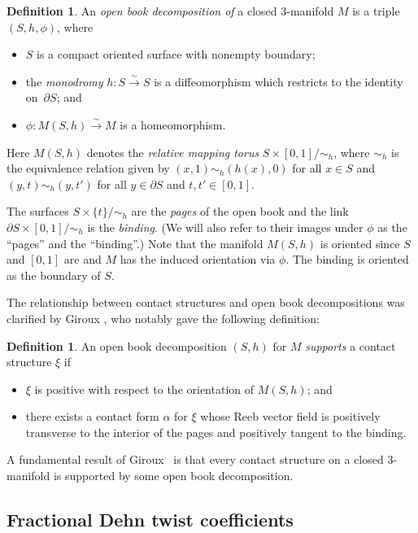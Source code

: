 \documentclass[JEP,XML,SOM,Unicode,NoFloatCountersInSection]{cedram}
\newcommand{\isom}{\stackrel\sim\longrightarrow}
\theoremstyle{plain}
\theoremstyle{definition}
\newtheorem{defn}[thm]{Definition}
\numberwithin{equation}{subsection}
\begin{document}

\begin{defn}
An {\em open book decomposition of} a closed $3$-manifold $M$ is a triple $(S,h,\phi)$, where
\begin{itemize}
\item $S$ is a compact oriented surface with nonempty boundary;
\item the {\em monodromy} $h:S\isom S$ is a diffeomorphism which restricts to the identity on~$\partial S$; and
\item $\phi : M(S,h) \isom M$ is a homeomorphism.
\end{itemize}
Here $M(S,h)$ denotes the {\em relative mapping torus} $S\times [0,1]/\sim_h$, where $\sim_h$ is the equivalence relation given by $(x,1)\sim_h (h(x),0)$ for all $x\in S$ and $(y,t)\sim_h (y,t')$ for all $y\in \partial S$ and $t,t' \in [0,1]$.
\end{defn}

The surfaces $S\times \{ t\}/\sim_h$ are the {\em pages} of the open book and the link $\partial S\times [0,1]/\sim_h$ is the {\em binding}. (We will also refer to their images under $\phi$ as the ``pages'' and the ``binding''.) Note that the manifold $M(S,h)$ is oriented since $S$ and $[0,1]$ are and $M$ has the induced orientation via $\phi$. The binding is oriented as the boundary of $S$.

The relationship between contact structures and open book decompositions was clarified by Giroux \cite{Gi}, who notably gave the following definition:

\begin{defn}
An open book decomposition $(S,h)$ for $M$ {\em supports} a contact structure $\xi$ if
\begin{itemize}
\item $\xi$ is positive with respect to the orientation of $M(S,h)$; and
\item there exists a contact form $\alpha$ for $\xi$ whose Reeb vector field is positively transverse to the interior of the pages and positively tangent to the binding.
\end{itemize}
\end{defn}

A fundamental result of Giroux~\cite{Gi} is that every contact structure on a closed $3$-manifold is supported by some open book decomposition.

\subsection{Fractional Dehn twist coefficients}
\end{document}
